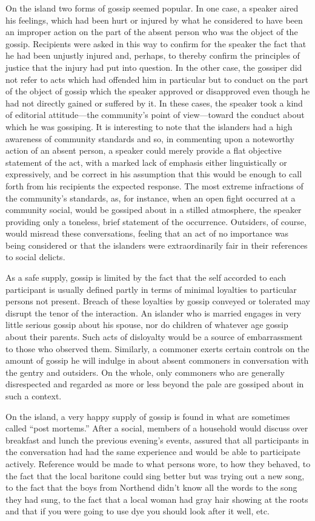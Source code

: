 \documentclass[openany,nobib]{tufte-book}
\begin{document}
On the island two forms of gossip seemed popular. In one case, a speaker
aired his feelings, which had been hurt or injured by what he considered
to have been an improper action on the part of the absent person who was
the object of the gossip. Recipients were asked in this way to confirm
for the speaker the fact that he had been unjustly injured and, perhaps,
to thereby confirm the principles of justice that the injury had put
into question. In the other case, the gossiper did not refer to acts
which had offended him in particular but to conduct on the part of the
object of gossip which the speaker approved or disapproved even though
he had not directly gained or suffered by it. In these cases, the
speaker took a kind of editorial attitude---the community's point of
view---toward the conduct about which he was gossiping. It is
interesting to note that the islanders had a high awareness of community
standards and so, in commenting upon a noteworthy action of an absent
person, a speaker could merely provide a flat objective statement of the
act, with a marked lack of emphasis either linguistically or
expressively, and be correct in his assumption that this would be enough
to call forth from his recipients the expected response. The most
extreme infractions of the community's standards, as, for instance, when
an open fight occurred at a community social, would be gossiped about in
a stilled atmosphere, the speaker providing only a toneless, brief
statement of the occurrence. Outsiders, of course, would misread these
conversations, feeling that an act of no importance was being considered
or that the islanders were extraordinarily fair in their references to
social delicts.

As a safe supply, gossip is limited by the fact that the self accorded
to each participant is usually defined partly in terms of minimal
loyalties to particular persons not present. Breach of these loyalties
by gossip conveyed or tolerated may disrupt the tenor of the
interaction. An islander who is married engages in very little serious
gossip about his spouse, nor do children of whatever age gossip about
their parents. Such acts of disloyalty would be a source of
embarrassment to those who observed them. Similarly, a commoner exerts
certain controls on the amount of gossip he will indulge in about absent
commoners in conversation with the gentry and outsiders. On the whole,
only commoners who are generally disrespected and regarded as more or
less beyond the pale are gossiped about in such a context.

On the island, a very happy supply of gossip is found in what are
sometimes called ``post mortems.'' After a social, members of a
household would discuss over breakfast and lunch the previous evening's
events, assured that all participants in the conversation had had the
same experience and would be able to participate actively. Reference
would be made to what persons wore, to how they behaved, to the fact
that the local baritone could sing better but was trying out a new song,
to the fact that the boys from Northend didn't know all the words to the
song they had sung, to the fact that a local woman had gray hair showing
at the roots and that if you were going to use dye you should look after
it well, etc.
\end{document}
